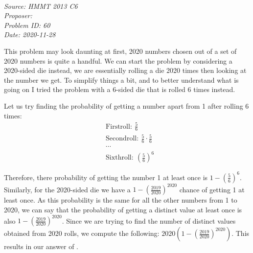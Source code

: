 \SSbreak\\
\emph{Source: HMMT 2013 C6}\\
\emph{Proposer: \Pchan}\\
\emph{Problem ID: 60}\\
\emph{Date: 2020-11-28}\\
\SSbreak

\bigskip 

\begin{solution}\hfil\medskip
    
    This problem may look daunting at first, 2020 numbers chosen out of a set of 2020 numbers is quite a handful.
    We can start the problem by considering a 2020-sided die instead, we are essentially rolling a die 2020 times then looking at the number we get. To simplify things a bit, and to better understand what is going on I tried the problem with a 6-sided die that is rolled 6 times instead.\medskip

    Let us try finding the probability of getting a number apart from 1 after rolling 6 times:
    \begin{align*}
        &\mathrm{First roll:}\ \frac{5}{6}\\
        &\mathrm{Second roll:}\ \frac{5}{6}\cdot\frac{5}{6}\\
        &\cdots\\
        &\mathrm{Sixth roll:}\ \left(\frac{5}{6}\right)^6
    \end{align*}

    Therefore, there probability of getting the number 1 at least once is \(1-\left(\frac{5}{6}\right)^6\). Similarly, for the 2020-sided die we have a \(1-\left(\frac{2019}{2020}\right)^{2020}\) chance of getting 1 at least once. As this probability is the same for all the other numbers from 1 to 2020, we can say that the probability of getting a distinct value at least once is also \(1-\left(\frac{2019}{2020}\right)^{2020}\). Since we are trying to find the number of distinct values obtained from 2020 rolls, we compute the following: \(2020\left(1-\left(\frac{2019}{2020}\right)^{2020}\right)\). This results in our answer of .


\end{solution}